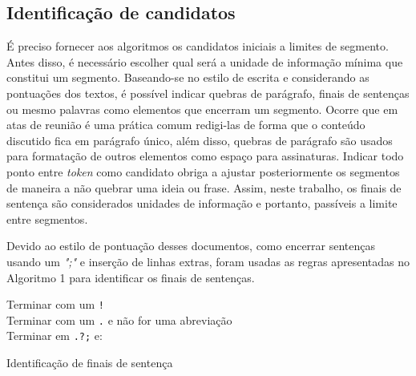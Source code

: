


\subsection{Identificação de candidatos}
	\label{subsec:indentificacaosentencas}
	
	
	
	É preciso fornecer aos algoritmos os candidatos iniciais a limites de segmento. Antes disso, é necessário escolher qual será a unidade de informação mínima que constitui um segmento. Baseando-se no estilo de escrita e considerando as pontuações dos textos, é possível indicar quebras de parágrafo, finais de sentenças ou mesmo palavras como elementos que encerram um segmento. 
	Ocorre que em atas de reunião é uma prática comum redigi-las de forma que o conteúdo discutido fica em parágrafo único, além disso, quebras de parágrafo são usados para formatação de outros elementos como espaço para assinaturas. 
	Indicar todo ponto entre \textit{token} como candidato obriga a ajustar posteriormente os segmentos de maneira a não quebrar uma ideia ou frase. Assim, neste trabalho, os finais de sentença são considerados unidades de informação e portanto, passíveis a limite entre segmentos. 
	
	Devido ao estilo de pontuação desses documentos, como encerrar sentenças usando um \textit{";"} e inserção de linhas extras, foram usadas as regras apresentadas no Algoritmo 1 para identificar os finais de sentenças.  


\begin{algorithm}

	
	
	 {	

	Terminar com um \texttt{!}\\
	Terminar com um \texttt{.} e não for uma abreviação\\
	Terminar em \texttt{.?;} e:
	}
	
	\caption{Identificação de finais de sentença}
\end{algorithm}






